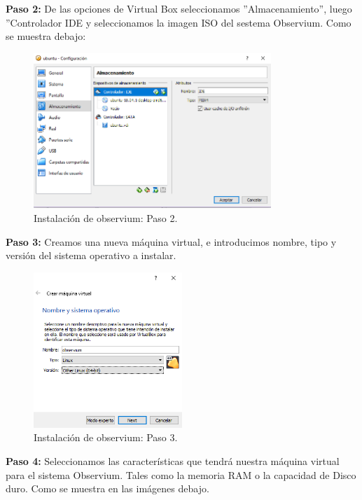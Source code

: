 \noindent
\textbf{Paso 2:} De las opciones de Virtual Box seleccionamos ''Almacenamiento'', luego ''Controlador IDE y seleccionamos la imagen ISO del sestema Observium. Como se muestra debajo: 

\begin{figure}[htbp!]
	\centering
		\includegraphics[width=0.8\textwidth]{images/desarrollo/instalarObservium_paso2.png}
	\caption{Instalación de observium: Paso 2.}
\end{figure} 

\pagebreak
\noindent
\textbf{Paso 3:} Creamos una nueva máquina virtual, e introducimos nombre, tipo y versión del sistema operativo a instalar. 

\begin{figure}[htbp!]
	\centering
		\includegraphics[width=0.5\textwidth]{images/desarrollo/instalarObservium_paso3.png}
	\caption{Instalación de observium: Paso 3.}
\end{figure} 

\noindent
\textbf{Paso 4:} Seleccionamos las características que tendrá nuestra máquina virtual para el sistema Observium. Tales como la memoria RAM o la capacidad de Disco duro. Como se muestra en las imágenes debajo. 

